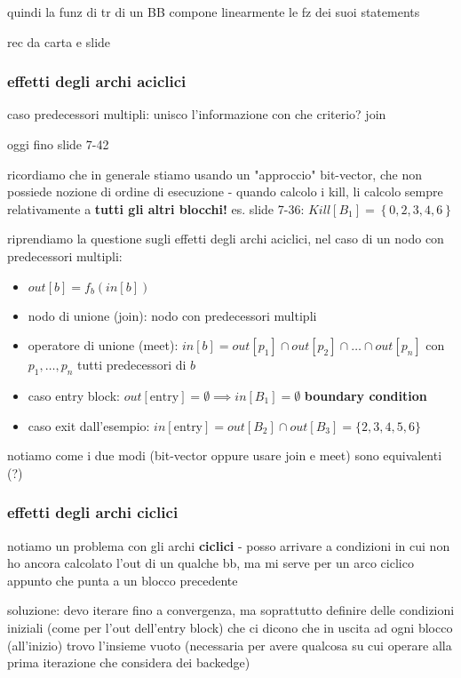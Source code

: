 quindi la funz di tr di un BB compone linearmente le fz dei suoi statements

rec da carta e slide

\subsubsection{effetti degli archi aciclici}

caso predecessori multipli: unisco l'informazione con che criterio? join

oggi fino slide 7-42

ricordiamo che in generale stiamo usando un "approccio" bit-vector, che non possiede nozione di ordine di esecuzione - quando calcolo i kill, li calcolo sempre relativamente a \textbf{tutti gli altri blocchi!} es. slide 7-36: $Kill[B_1] = \left\lbrace0,2,3,4,6\right\rbrace$

riprendiamo la questione sugli effetti degli archi aciclici, nel caso di un nodo con predecessori multipli:
\begin{itemize}
  \item $out[b] = f_b(in[b])$
  \item nodo di unione (join): nodo con predecessori multipli
  \item operatore di unione (meet): $in[b] = out[p_1] \cap out[p_2] \cap \ldots \cap out[p_n]$ con $p_1,\ldots,p_n$ tutti predecessori di $b$
  \item caso entry block: $out[\text{entry}] = \emptyset \implies in[B_1] = \emptyset$ \textbf{boundary condition}
  \item caso exit dall'esempio: $in[\text{entry}] = out[B_2] \cap out[B_3] = \lbrace 2,3,4,5,6 \rbrace$
\end{itemize}

notiamo come i due modi (bit-vector oppure usare join e meet) sono equivalenti (?)

\subsubsection{effetti degli archi ciclici}

notiamo un problema con gli archi \textbf{ciclici} - posso arrivare a condizioni in cui non ho ancora calcolato l'out di un qualche bb, ma mi serve per un arco ciclico appunto che punta a un blocco precedente

soluzione: devo iterare fino a convergenza, ma soprattutto definire delle condizioni iniziali (come per l'out dell'entry block) che ci dicono che in uscita ad ogni blocco (all'inizio) trovo l'insieme vuoto (necessaria per avere qualcosa su cui operare alla prima iterazione che considera dei backedge)

